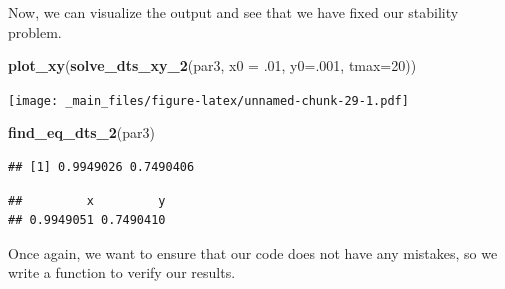 \documentclass[
]{book}
\newenvironment{Shaded}{\begin{snugshade}}{\end{snugshade}}
\newcommand{\AttributeTok}[1]{\textcolor[rgb]{0.13,0.29,0.53}{#1}}
\newcommand{\ControlFlowTok}[1]{\textcolor[rgb]{0.13,0.29,0.53}{\textbf{#1}}}
\newcommand{\DecValTok}[1]{\textcolor[rgb]{0.00,0.00,0.81}{#1}}
\newcommand{\FunctionTok}[1]{\textcolor[rgb]{0.13,0.29,0.53}{\textbf{#1}}}
\newcommand{\NormalTok}[1]{#1}
\newcommand{\OtherTok}[1]{\textcolor[rgb]{0.56,0.35,0.01}{#1}}
\newcommand{\SpecialCharTok}[1]{\textcolor[rgb]{0.81,0.36,0.00}{\textbf{#1}}}
\begin{document}
Now, we can visualize the output and see that we have fixed our stability problem.

\begin{Shaded}
\begin{Highlighting}[]
\FunctionTok{plot\_xy}\NormalTok{(}\FunctionTok{solve\_dts\_xy\_2}\NormalTok{(par3, }\AttributeTok{x0 =}\NormalTok{ .}\DecValTok{01}\NormalTok{, }\AttributeTok{y0=}\NormalTok{.}\DecValTok{001}\NormalTok{, }\AttributeTok{tmax=}\DecValTok{20}\NormalTok{)) }
\end{Highlighting}
\end{Shaded}

\texttt{[image: \_main\_files/figure-latex/unnamed-chunk-29-1.pdf]}

\begin{Shaded}
\begin{Highlighting}[]
\FunctionTok{find\_eq\_dts\_2}\NormalTok{(par3)}
\end{Highlighting}
\end{Shaded}

\begin{verbatim}
## [1] 0.9949026 0.7490406
\end{verbatim}

\begin{Shaded}
\end{Shaded}

\begin{verbatim}
##         x         y 
## 0.9949051 0.7490410
\end{verbatim}

Once again, we want to ensure that our code does not have any mistakes, so we write a function to verify our results.

\begin{Shaded}
\end{Shaded}
\end{document}

